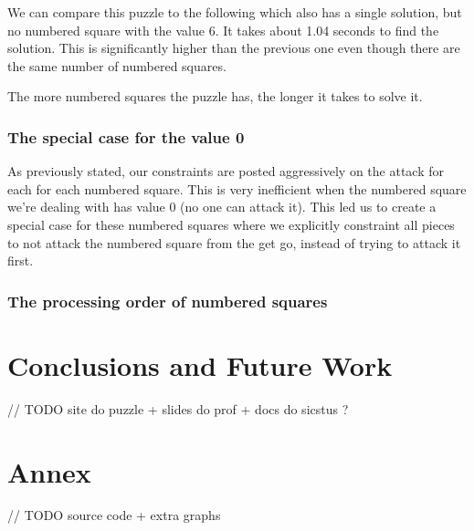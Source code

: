 \documentclass[runningheads]{llncs}
\begin{document}
We can compare this puzzle to the following which also has a single solution,
but no numbered square with the value 6. It takes about 1.04 seconds to
find the solution. This is significantly higher than the previous one
even though there are the same number of numbered squares.

The more numbered squares the puzzle has, the longer it takes to solve it.

\subsubsection{The special case for the value 0}
As previously stated, our constraints are posted aggressively on the attack
for each for each numbered square. This is very inefficient when the numbered
square we're dealing with has value 0 (no one can attack it). This led us to
create a special case for these numbered squares where we explicitly constraint
all pieces to not attack the numbered square from the get go, instead of
trying to attack it first.

\subsubsection{The processing order of numbered squares}

\section{Conclusions and Future Work}

// TODO site do puzzle + slides do prof + docs do sicstus ?
\begin{thebibliography}{8}




\end{thebibliography}

\section{Annex}

// TODO source code + extra graphs
\end{document}

